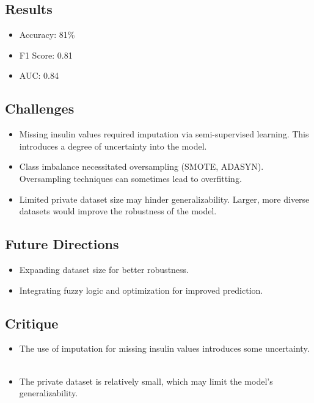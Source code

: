 \subsection*{Results}
\begin{itemize}
    \item Accuracy: 81\%
    \item F1 Score: 0.81
    \item AUC: 0.84
\end{itemize}

\subsection*{Challenges}
\begin{itemize}
    \item Missing insulin values required imputation via semi-supervised learning. This introduces a degree of uncertainty into the model.
    \item Class imbalance necessitated oversampling (SMOTE, ADASYN). Oversampling techniques can sometimes lead to overfitting.
    \item Limited private dataset size may hinder generalizability. Larger, more diverse datasets would improve the robustness of the model.
\end{itemize}

\subsection*{Future Directions}
\begin{itemize}
    \item Expanding dataset size for better robustness.
    \item Integrating fuzzy logic and optimization for improved prediction.
\end{itemize}

\subsection*{Critique}
\begin{itemize}
    \item The use of imputation for missing insulin values introduces some uncertainty.    
    \item The private dataset is relatively small, which may limit the model's generalizability.    
    
\end{itemize}

